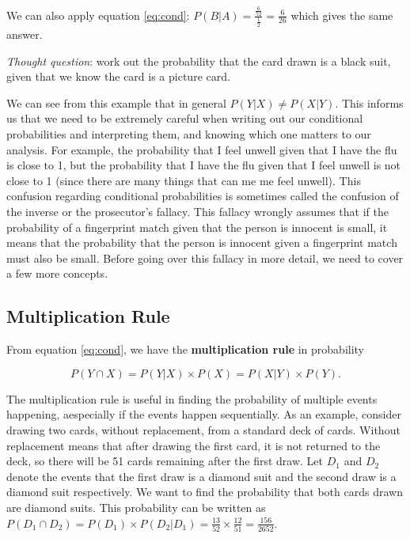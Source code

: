 \documentclass[
]{book}
\begin{document}
We can also apply equation \eqref{eq:cond}: \(P(B|A) = \frac{\frac{6}{52}}{\frac{1}{2}} = \frac{6}{26}\) which gives the same answer.

\emph{Thought question}: work out the probability that the card drawn is a black suit, given that we know the card is a picture card.

We can see from this example that in general \(P(Y|X) \neq P(X|Y)\). This informs us that we need to be extremely careful when writing out our conditional probabilities and interpreting them, and knowing which one matters to our analysis. For example, the probability that I feel unwell given that I have the flu is close to 1, but the probability that I have the flu given that I feel unwell is not close to 1 (since there are many things that can me me feel unwell). This confusion regarding conditional probabilities is sometimes called the confusion of the inverse or the prosecutor's fallacy. This fallacy wrongly assumes that if the probability of a fingerprint match given that the person is innocent is small, it means that the probability that the person is innocent given a fingerprint match must also be small. Before going over this fallacy in more detail, we need to cover a few more concepts.

\subsection{Multiplication Rule}\label{multiplication-rule}

From equation \eqref{eq:cond}, we have the \textbf{multiplication rule} in probability

\begin{equation} 
P(Y \cap X) = P(Y|X) \times P(X) = P(X|Y) \times P(Y).
\label{eq:mult}
\end{equation}

The multiplication rule is useful in finding the probability of multiple events happening, aespecially if the events happen sequentially. As an example, consider drawing two cards, without replacement, from a standard deck of cards. Without replacement means that after drawing the first card, it is not returned to the deck, so there will be 51 cards remaining after the first draw. Let \(D_1\) and \(D_2\) denote the events that the first draw is a diamond suit and the second draw is a diamond suit respectively. We want to find the probability that both cards drawn are diamond suits. This probability can be written as \(P(D_1 \cap D_2) = P(D_1) \times P(D_2|D_1)  = \frac{13}{52} \times \frac{12}{51}  = \frac{156}{2652}\).
\end{document}
